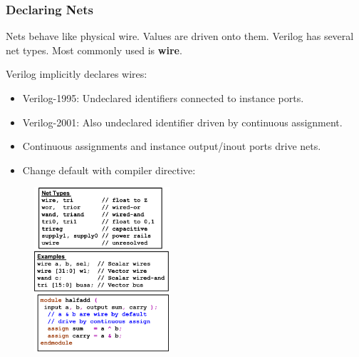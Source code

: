 \documentclass[t, notes, xcolor=table]{beamer}
\begin{document}
\begin{frame}[fragile]
\frametitle{Declaring Nets}
\scriptsize{
\begin{multicols}{2}
Nets behave like physical wire. Values are driven onto them. Verilog has several net types.
Most commonly used is \textbf{wire}.

Verilog implicitly declares wires:
\begin{itemize}
\item Verilog-1995: Undeclared identifiers connected to instance ports.
\item Verilog-2001: Also undeclared identifier driven by continuous assignment.
\item Continuous assignments and instance output/inout ports drive nets.
\item Change default with compiler directive:
\begin{itemize}
\scriptsize{
	\item \begin{Verbatim}[commandchars=\\\{\}, tabsize=2]
\textcolor{blue}{`default_nettype <nettype>}
\end{Verbatim}
}
\end{itemize}
\end{itemize}
\vfill
\columnbreak

\begin{figure}
    \includegraphics[width=0.45\textwidth]{img/04_declaring_nets.png}
\end{figure}
\end{multicols}
}
\end{frame}
\end{document}
